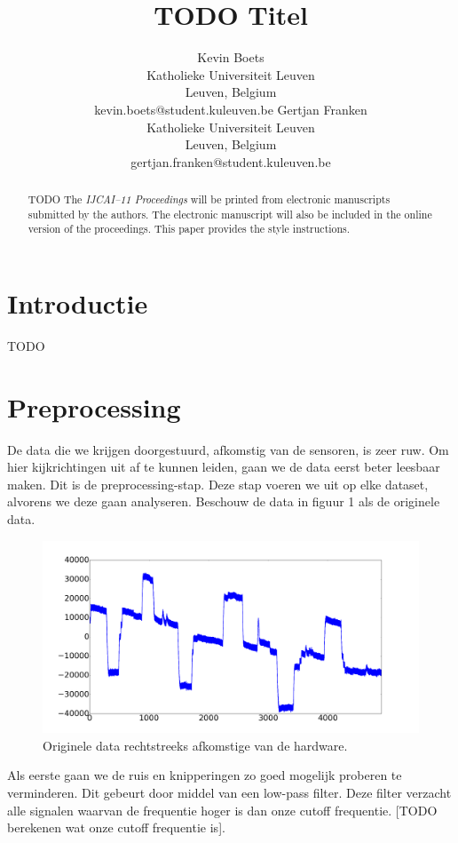 \documentclass{article}
\title{TODO Titel}
\author{Kevin Boets \\ Katholieke Universiteit Leuven\\ Leuven, Belgium \\ kevin.boets@student.kuleuven.be
\And
Gertjan Franken \\ Katholieke Universiteit Leuven\\ Leuven, Belgium \\ gertjan.franken@student.kuleuven.be}
\begin{document}
\maketitle

\begin{abstract}
 TODO
  The {\it IJCAI--11 Proceedings} will be printed from electronic
  manuscripts submitted by the authors. The electronic manuscript will
  also be included in the online version of the proceedings. This paper
  provides the style instructions.
\end{abstract}

\section{Introductie}

TODO 

\section{Preprocessing}

De data die we krijgen doorgestuurd, afkomstig van de sensoren, is zeer ruw. Om hier kijkrichtingen uit af te kunnen leiden, gaan we de data eerst beter leesbaar maken. Dit is de preprocessing-stap. Deze stap voeren we uit op elke dataset,  alvorens we deze gaan analyseren. Beschouw de data in figuur 1 als de originele data.

\begin{figure}[h]
\centering
\includegraphics[width=\linewidth]{images/original_data}
\caption{Originele data rechtstreeks afkomstige van de hardware.}
\end{figure}

Als eerste gaan we de ruis en knipperingen zo goed mogelijk proberen te verminderen. Dit gebeurt door middel van een low-pass filter. Deze filter verzacht alle signalen waarvan de frequentie hoger is dan onze cutoff frequentie. [TODO berekenen wat onze cutoff frequentie is].
\end{document}
